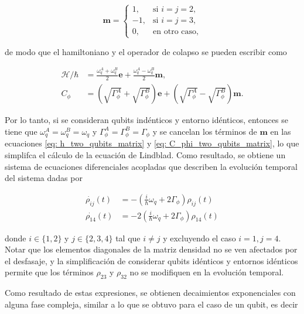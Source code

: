 \begin{equation} \nonumber
    \mathbf{m} =
    \begin{cases}
        1, & \text{si } i = j = 2, \\
        -1, & \text{si } i = j = 3, \\
        0, & \text{en otro caso,}
    \end{cases}
\end{equation}

\noindent de modo que el hamiltoniano y el operador de colapso se pueden escribir como

\begin{align}
    \mathcal{H}/\hbar &= \frac{\omega_q^{A}+\omega_q^{B}}{2} \mathbf{e} + \frac{\omega_q^{A}-\omega_q^{B}}{2} \mathbf{m}, \label{eq: h_two_qubits_matrix} \\
    C_\phi &= \left(\sqrt{\Gamma_\phi^{A}} + \sqrt{\Gamma_\phi^{B}}\right) \mathbf{e} + \left(\sqrt{\Gamma_\phi^{A}} - \sqrt{\Gamma_\phi^{B}}\right) \mathbf{m}. \label{eq: C_phi_two_qubits_matrix}
\end{align}

Por lo tanto, si se consideran qubits indénticos y entorno idénticos, entonces se tiene que \(\omega_q^A = \omega_q^B = \omega_q\) y \(\Gamma_\phi^A = \Gamma_\phi^B =\Gamma_\phi\) y se cancelan los términos de \(\mathbf{m}\) en las ecuaciones \ref{eq: h_two_qubits_matrix} y \ref{eq: C_phi_two_qubits_matrix}, lo que simplifca el cálculo de la ecuación de Lindblad. Como resultado, se obtiene un sistema de ecuaciones diferenciales acopladas que describen la evolución temporal del sistema dadas por

\begin{align}
    \dot{\rho_{ij}}(t) &= - \left(\frac{i}{\hbar} \omega_q + 2 \Gamma_\phi\right) \rho_{ij}(t) \nonumber \\
    \dot{\rho_{14}}(t) &= -2 \left(\frac{i}{\hbar} \omega_q + 2 \Gamma_\phi\right) \rho_{14}(t) \nonumber 
\end{align}

\noindent donde \(i \in \{1, 2\} \) y \(j \in \{2, 3, 4\}\) tal que \(i\neq j\) y excluyendo el caso \(i = 1, j = 4\). Notar que los elementos diagonales de la matriz densidad no se ven afectados por el desfasaje, y la simplificación de considerar qubits idénticos y entornos idénticos permite que los términos \(\rho_{23}\) y \(\rho_{32}\) no se modifiquen en la evolución temporal.

Como resultado de estas expresiones, se obtienen decaimientos exponenciales con alguna fase compleja, similar a lo que se obtuvo para el caso de un qubit, es decir

